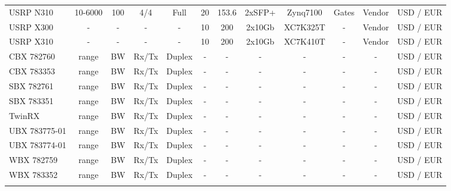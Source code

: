 \begin{sidewaystable*}
\begin{tabularx}{\textwidth}{@{}l*{10}{C}c@{}}
USRP N310 & 10-6000 & 100 & 4/4 & Full & 20 & 153.6 & 2xSFP+ & Zynq7100 & Gates & Vendor & USD / EUR  \\ 

\addlinespace 

USRP X300 & - & - & - & - & 10 & 200 & 2x10Gb & XC7K325T & - & Vendor & USD / EUR  \\  

USRP X310 & - & - & - & - & 10 & 200 & 2x10Gb & XC7K410T & - & Vendor & USD / EUR  \\  

\addlinespace 
\midrule
\addlinespace 

CBX 782760 & range & BW & Rx/Tx & Duplex & - & - & - & - & - & - & USD / EUR  \\ 
CBX 783353 & range & BW & Rx/Tx & Duplex & - & - & - & - & - & - & USD / EUR  \\
\addlinespace  
SBX 782761 & range & BW & Rx/Tx & Duplex & - & - & - & - & - & - & USD / EUR  \\  
SBX 783351 & range & BW & Rx/Tx & Duplex & - & - & - & - & - & - & USD / EUR  \\  
\addlinespace 
TwinRX & range & BW & Rx/Tx & Duplex & - & - & - & - & - & - & USD / EUR  \\ 
\addlinespace 
UBX 783775-01 & range & BW & Rx/Tx & Duplex & - & - & - & - & - & - & USD / EUR  \\  
UBX 783774-01 & range & BW & Rx/Tx & Duplex & - & - & - & - & - & - & USD / EUR  \\ 
\addlinespace  
WBX 782759 & range & BW & Rx/Tx & Duplex & - & - & - & - & - & - & USD / EUR  \\  
WBX 783352 & range & BW & Rx/Tx & Duplex & - & - & - & - & - & - & USD / EUR  \\  

\addlinespace 
\midrule
\end{tabularx}
\end{sidewaystable*}


